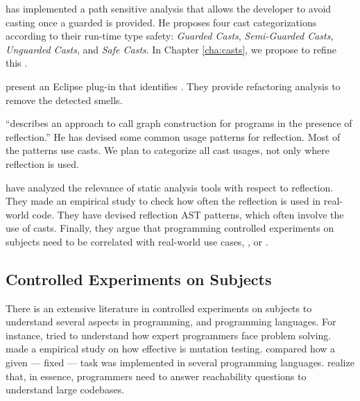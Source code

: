 \cite{wintherGuardedTypePromotion2011} has implemented a path sensitive analysis that allows the developer to avoid casting once a guarded  is provided.
He proposes four cast categorizations according to their run-time type safety: \emph{Guarded Casts}, \emph{Semi-Guarded Casts}, \emph{Unguarded Casts}, and \emph{Safe Casts}.
In Chapter \ref{cha:casts}, we propose to refine this
.

\cite{tsantalisJDeodorantIdentificationRemoval2008} present an Eclipse plug-in that identifies
.
They provide refactoring analysis to remove the detected smells.

\cite{livshitsImprovingSoftwareSecurity2006,livshitsReflectionAnalysisJava2005} ``describes an approach to call graph construction for \java{} programs in the presence of reflection.''
He has devised some common usage patterns for reflection.
Most of the patterns use casts.
We plan to categorize all cast usages, not only where reflection is used.

\cite{landmanChallengesStaticAnalysis2017} have analyzed the relevance of static analysis tools with respect to reflection.
They made an empirical study to check how often the reflection \api{} is used in real-world code.
They have devised reflection AST patterns, which often involve the use of casts.
Finally, they argue that programming controlled experiments on subjects need to be correlated with real-world use cases, \eg{}, \github{} or \mavencentral{}.


\subsection*{Controlled Experiments on Subjects }
There is an extensive literature \perse{} in controlled experiments on subjects to understand several aspects in programming, and programming languages.
For instance, \cite{solowayEmpiricalStudiesProgramming1984} tried to understand  how expert programmers face problem solving.
\cite{buddTheoreticalEmpiricalStudies1980} made a empirical study on how effective is mutation testing.
\cite{precheltEmpiricalComparisonSeven2000} compared how a given --- fixed --- task was implemented in several programming languages.
%
\cite{latozaDevelopersAskReachability2010} realize that, in essence, programmers need to answer reachability questions to understand large codebases.

